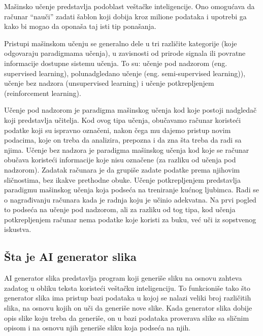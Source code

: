 \documentclass[12pt, letterpaper]{article}
\begin{document}
  

Mašinsko učenje predstavlja podoblast veštačke inteligencije. Ono omogućava da računar “nauči” zadati šablon koji dobija kroz milione podataka i upotrebi ga kako bi mogao da oponaša taj isti tip ponašanja.   

  

Pristupi mašinskom učenju se generalno dele u tri različite kategorije (koje odgovaraju paradigmama učenja), u zavisnosti od prirode signala ili povratne informacije dostupne sistemu učenja. To su: učenje pod nadzorom (eng. supervised learning), polunadgledano učenje (eng. semi-supervised learning)), učenje bez nadzora (unsupervised learning) i učenje potkrepljenjem (reinforcement learning).  

  

Učenje pod nadzorom je paradigma mašinskog učenja kod koje postoji nadgledač koji predstavlja učitelja. Kod ovog tipa učenja, obučavamo računar koristeći podatke koji su ispravno označeni, nakon čega mu dajemo pristup novim podacima, koje on treba da analizira, prepozna i da zna šta treba da radi sa njima. Učenje bez nadzora je paradigma mašinskog učenja kod koje se računar obučava koristeći informacije koje nisu označene (za razliku od učenja pod nadzorom). Zadatak računara je da grupiše zadate podatke prema njihovim sličnostima, bez ikakve prethodne obuke. Učenje potkrepljenjem predstavlja paradigmu mašinskog učenja koja podseća na treniranje kućnog ljubimca. Radi se o nagrađivanju računara kada je radnja koju je učinio adekvatna. Na prvi pogled to podseća na učenje pod nadzorom, ali za razliku od tog tipa, kod učenja potkrepljenjem računar nema podatke koje koristi za buku, već uči iz sopstvenog iskustva. \cite{kljucDva} 

  

\subsection*{Šta je AI generator slika} 

AI generator slika predstavlja program koji generiše sliku na osnovu zahteva zadatog u obliku teksta koristeći veštačku inteligenciju. To funkcioniše tako što generator slika ima pristup bazi podataka u kojoj se nalazi veliki broj različitih slika, na osnovu kojih on uči da generiše nove slike. Kada generator slika dobije opis slike koju treba da generiše, on u bazi podataka proverava slike sa sličnim opisom i na osnovu njih generiše sliku koja podseća na njih.  

  
\end{document}
